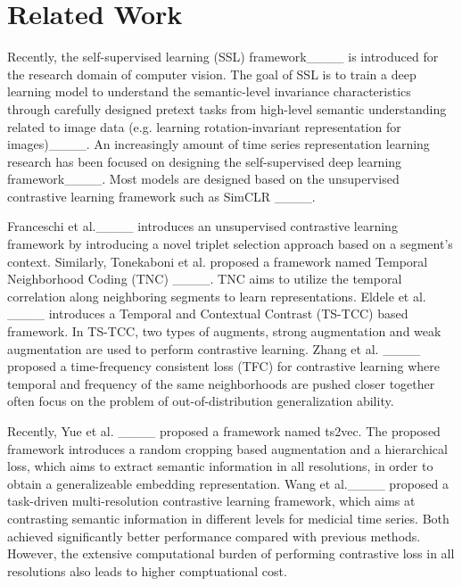 \section{Related Work}
Recently, the self-supervised learning (SSL) framework____ is introduced for the research domain of computer vision. The goal of SSL is to train a deep learning model to understand the semantic-level invariance characteristics through carefully designed pretext tasks from  high-level semantic understanding related to image data (e.g. learning rotation-invariant representation for images)____. An increasingly amount of time series representation learning research has been focused on designing the self-supervised deep learning framework____. Most models are designed based on the unsupervised contrastive learning framework such as SimCLR ____. 

Franceschi et al.____ introduces an unsupervised contrastive learning framework by introducing a novel triplet selection approach based on a segment's context. Similarly, Tonekaboni et al. proposed a framework named Temporal Neighborhood Coding (TNC) ____. TNC aims to utilize the temporal correlation along neighboring segments to learn representations. Eldele et al. ____ introduces a Temporal and Contextual Contrast (TS-TCC) based framework.  In TS-TCC, two types of augments, strong augmentation and weak augmentation are used to perform contrastive learning. Zhang et al. ____ proposed a time-frequency consistent loss (TFC) for contrastive learning where temporal and frequency of the same neighborhoods are pushed closer together often focus on the problem of out-of-distribution generalization ability. 

Recently, Yue et al. ____ proposed a framework named ts2vec. The proposed framework introduces a random cropping based augmentation and a hierarchical loss, which aims to extract semantic information in all resolutions, in order to obtain a generalizeable embedding representation. Wang et al.____ proposed a task-driven multi-resolution contrastive learning framework, which aims at contrasting semantic information in different levels for medicial time series.  Both achieved significantly better performance compared with previous methods. However, the extensive computational burden of performing contrastive loss in all resolutions also leads to higher comptuational cost.